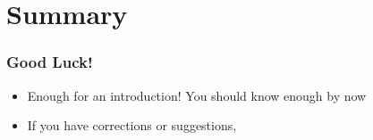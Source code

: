 \section{Summary}

\begin{frame}
\frametitle{Good Luck!}
\begin{itemize}
    \item Enough for an introduction! You should know enough by now
    \item If you have corrections or suggestions, 
\end{itemize}

\end{frame}